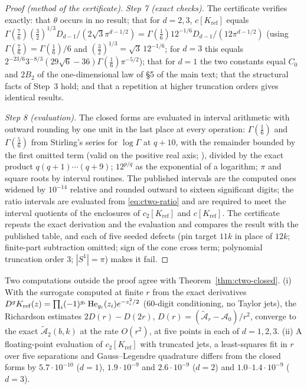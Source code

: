 \begin{proof}[Proof (method of the certificate)]
\emph{Step 7 (exact checks).} The certificate verifies exactly: that $\theta$ occurs in no result; that for $d=2,3$, $c[K_{\mathrm{ref}}]$ equals $\Gamma(\frac76)(\frac32)^{1/3}D_{d-1}/(2\sqrt3\pi^{d-1/2})=\Gamma(\frac16)12^{-1/6}D_{d-1}/(12\pi^{d-1/2})$ (using $\Gamma(\frac76)=\Gamma(\frac16)/6$ and $(\frac32)^{1/3}=\sqrt3\,12^{-1/6}$; for $d=3$ this equals $2^{-23/6}3^{-8/3}(29\sqrt6-36)\Gamma(\frac16)\pi^{-5/2}$); that for $d=1$ the two constants equal $C_0$ and $2B_2$ of the one-dimensional law of \S5 of the main text; that the structural facts of Step~3 hold; and that a repetition at higher truncation orders gives identical results.

\emph{Step 8 (evaluation).} The closed forms are evaluated in interval arithmetic with outward rounding by one unit in the last place at every operation: $\Gamma(\frac16)$ and $\Gamma(\frac56)$ from Stirling's series for $\log\Gamma$ at $q+10$, with the remainder bounded by the first omitted term (valid on the positive real axis; \cite[\S5.11(ii)]{DLMF}), divided by the exact product $q(q+1)\cdots(q+9)$; $12^{p/q}$ as the exponential of a logarithm; $\pi$ and square roots by interval routines. The published intervals are the computed ones widened by $10^{-14}$ relative and rounded outward to sixteen significant digits; the ratio intervals are evaluated from \eqref{eq:ctwo-ratio} and are required to meet the interval quotients of the enclosures of $c_2[K_{\mathrm{ref}}]$ and $c[K_{\mathrm{ref}}]$. The certificate repeats the exact derivation and the evaluation and compares the result with the published table, and each of five seeded defects (pin target $11k$ in place of $12k$; finite-part subtraction omitted; sign of the cone cross term; polynomial truncation order $3$; $|S^1|=\pi$) makes it fail.
\end{proof}

\begin{remark}\label{rem:ctwo-controls}
Two computations outside the proof agree with Theorem~\ref{thm:ctwo-closed}. (i) With the surrogate computed at finite $r$ from the exact derivatives $D^gK_{\mathrm{ref}}(z)=\prod_i(-1)^{g_i}\operatorname{He}_{g_i}(z_i)e^{-z_i^2/2}$ (60-digit conditioning, no Taylor jets), the Richardson estimates $2D(r)-D(2r)$, $D(r)=(\widetilde{\mathcal A}_r-\mathcal A_0)/r^2$, converge to the exact $\widetilde{\mathcal A}_2(b,k)$ at the rate $O(r^2)$, at five points in each of $d=1,2,3$. (ii) A floating-point evaluation of $c_2[K_{\mathrm{ref}}]$ with truncated jets, a least-squares fit in $r$ over five separations and Gauss--Legendre quadrature differs from the closed forms by $5.7\cdot10^{-10}$ ($d=1$), $1.9\cdot10^{-9}$ and $2.6\cdot10^{-9}$ ($d=2$) and $1.0$--$1.4\cdot10^{-9}$ ($d=3$).
\end{remark}

